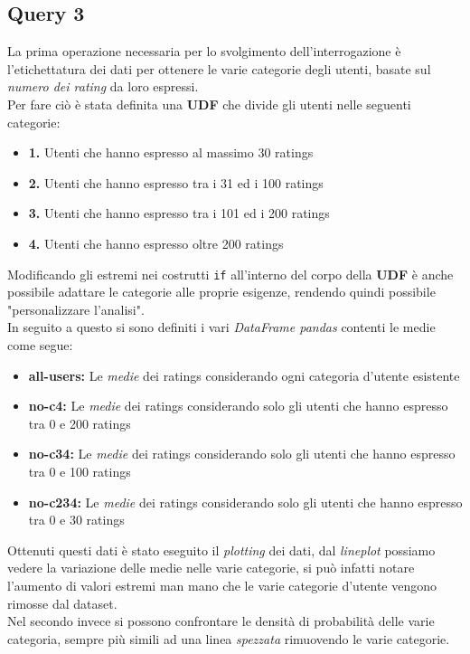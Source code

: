 \documentclass{article}
\begin{document}
    \newpage
    \subsection{Query 3}
        La prima operazione necessaria per lo svolgimento dell'interrogazione è l'etichettatura dei dati per ottenere le varie categorie degli utenti, basate sul \textit{numero dei rating} da loro espressi.\\
        Per fare ciò è stata definita una \textbf{UDF} che divide gli utenti nelle seguenti categorie:
        \begin{itemize}
            \item \textbf{1.} Utenti che hanno espresso al massimo 30 ratings
            \item \textbf{2.} Utenti che hanno espresso tra i 31 ed i 100 ratings
            \item \textbf{3.} Utenti che hanno espresso tra i 101 ed i 200 ratings
            \item \textbf{4.} Utenti che hanno espresso oltre 200 ratings
        \end{itemize}
        Modificando gli estremi nei costrutti \texttt{if} all'interno del corpo della \textbf{UDF} è anche possibile adattare le categorie alle proprie esigenze, rendendo quindi possibile "personalizzare l'analisi".\\
        In seguito a questo si sono definiti i vari \textit{DataFrame pandas} contenti le medie come segue:
        \begin{itemize}
            \item \textbf{all-users:} Le \textit{medie} dei ratings considerando ogni categoria d'utente esistente
            \item \textbf{no-c4: } Le \textit{medie} dei ratings considerando solo gli utenti che hanno espresso tra 0 e 200 ratings
            \item \textbf{no-c34: } Le \textit{medie} dei ratings considerando solo gli utenti che hanno espresso tra 0 e 100 ratings
            \item \textbf{no-c234: } Le \textit{medie} dei ratings considerando solo gli utenti che hanno espresso tra 0 e 30 ratings
        \end{itemize}
        Ottenuti questi dati è stato eseguito il \textit{plotting} dei dati, dal \textit{lineplot} possiamo vedere la variazione delle medie nelle varie categorie, si può infatti notare l'aumento di valori estremi man mano che le varie categorie d'utente vengono rimosse dal dataset.\\
        Nel secondo invece si possono confrontare le densità di probabilità delle varie categoria, sempre più simili ad una linea \textit{spezzata} rimuovendo le varie categorie.
\end{document}
